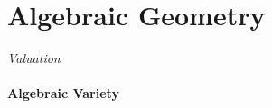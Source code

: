 \part{Algebraic Geometry}\label{sec:algebraic_geometry}

\emph{Valuation}

\subsection{Algebraic Variety}\label{subsec:algebraic_variety}
